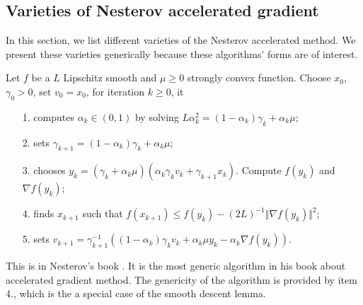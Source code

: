 \documentclass[12pt]{article}
\begin{document}
    \subsection{Varieties of Nesterov accelerated gradient}
        In this section, we list different varieties of the Nesterov accelerated method. 
        We present these varieties generically because these algorithms' forms are of interest.  
        \begin{definition}\label{def:agg_original}
            Let $f$ be a $L$ Lipschitz smooth and $\mu\ge 0$ strongly convex function. 
            Choose $x_0$, $\gamma_0 > 0$, set $v_0 = x_0$, for iteration $k\ge 0$, it
            \begin{enumerate}
                \item[1.] computes $\alpha_k \in (0, 1)$ by solving $L\alpha_k^2 = (1 - \alpha_k)\gamma_k + \alpha_k \mu$; 
                \item[2.] sets $\gamma_{k + 1} = (1 - \alpha_k)\gamma_k + \alpha_k \mu$;
                \item[3.] chooses $y_k = (\gamma_k + \alpha_k \mu)(\alpha_k \gamma_k v_k + \gamma_{k + 1}x_k)$. Compute $f(y_k)$ and $\nabla f(y_k)$; 
                \item[4.] finds $x_{k + 1}$ such that $f(x_{k + 1}) \le f(y_k) - (2L)^{-1} \Vert \nabla f(y_k)\Vert^2$; 
                \item[5.] sets $v_{k + 1} = \gamma_{k+1}^{-1}((1 - \alpha_k)\gamma_kv_k + \alpha_k \mu y_k - \alpha_k \nabla f(y_k))$. 
            \end{enumerate}
        \end{definition}
        \begin{remark}
            This is in Nesterov's book \cite[(2.2.7)]{nesterov_lectures_2018}. 
            It is the most generic algorithm in his book about accelerated gradient method. 
            The genericity of the algorithm is provided by item 4., which is the a special case of the smooth descent lemma. 
        \end{remark}

        \begin{definition}\label{def:agg_tri}
            
        \end{definition}

        \begin{definition}\label{agg_ppm}
            
        \end{definition}
\end{document}

